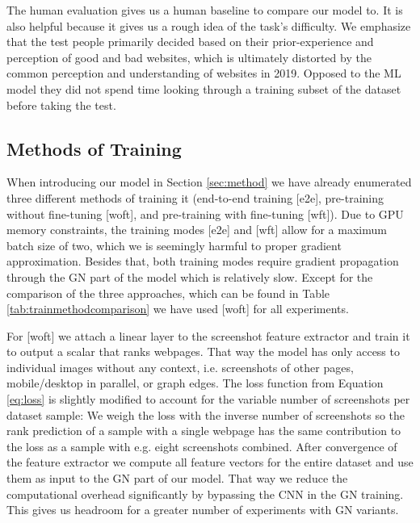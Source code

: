 The human evaluation gives us a human baseline to compare our model to. It is also helpful because it gives us a rough idea of the task's difficulty. We emphasize that the test people primarily decided based on their prior-experience and perception of good and bad websites, which is ultimately distorted by the common perception and understanding of websites in 2019. Opposed to the ML model they did not spend time looking through a training subset of the dataset before taking the test.

\subsection{Methods of Training}

When introducing our model in Section \ref{sec:method} we have already enumerated three different methods of training it (end-to-end training [e2e], pre-training without fine-tuning [woft], and pre-training with fine-tuning [wft]). Due to GPU memory constraints, the training modes [e2e] and [wft] allow for a maximum batch size of two, which we is seemingly harmful to proper gradient approximation. Besides that, both training modes require gradient propagation through the GN part of the model which is relatively slow. Except for the comparison of the three approaches, which can be found in Table \ref{tab:trainmethodcomparison} we have used [woft] for all experiments.

For [woft] we attach a linear layer to the screenshot feature extractor and train it to output a scalar that ranks webpages. That way the model has only access to individual images without any context, i.e. screenshots of other pages, mobile/desktop in parallel, or graph edges. The loss function from Equation \ref{eq:loss} is slightly modified to account for the variable number of screenshots per dataset sample: We weigh the loss with the inverse number of screenshots so the rank prediction of a sample with a single webpage has the same contribution to the loss as a sample with e.g. eight screenshots combined. After convergence of the feature extractor we compute all feature vectors for the entire dataset and use them as input to the GN part of our model. That way we reduce the computational overhead significantly by bypassing the CNN in the GN training. This gives us headroom for a greater number of experiments with GN variants.

